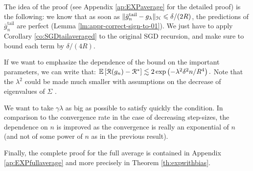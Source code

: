 %
\item The idea of the proof (see Appendix \ref{ap:EXPaverage} for the detailed proof) is the following: we know that as soon as $\|\bar{g}_n^{\textrm {tail}} - g_\lambda\|_{\mathcal H} \leqslant \delta/(2R)$, the predictions of $\bar{g}_n^{\textrm {tail}}$ are perfect (Lemma \ref{lm:appr-correct-sign-to-01}). We just have to apply  Corollary \ref{co:SGDtailaveraged} to   the original SGD recursion, and make sure to bound each term by $\delta/(4R)$. 
%
\item If we want to emphasize the dependence of the bound on the important parameters, we can write that: $\mathbb{E}\left[{{\cal R}(g_n) - {\cal R}^*}\right] \lesssim 2\exp\left( -\lambda^2 \delta^2n/R^4\right).$ Note that the $ \lambda^2 $ could be made much smaller with assumptions on the decrease of eigenvalues of $\Sigma$ \citep[it has been shown][that if the decay happens at speed $1/n^{\beta}$: $\tr \Sigma (\Sigma + \lambda \idm)^{-2} \leqslant \lambda^{-1}\tr \Sigma (\Sigma + \lambda \idm)^{-1}\leqslant R^2 / \lambda^{1+1/\beta}$]{caponnetto2007optimal}.
%
\item We want to take $\gamma \lambda$ as big as possible to satisfy quickly the condition. In comparison to the convergence rate in the case of decreasing step-sizes, the dependence on $n$ is improved as the convergence is really an exponential of $n$ (and not of some power of $n$ as in the previous result). 
%
\item Finally, the complete proof for the full average is contained in Appendix \ref{ap:EXPfullaverage} and more precisely in Theorem \ref{th:expwithbias}.

\EIT






